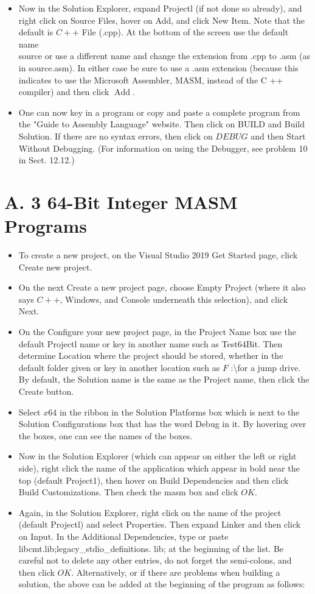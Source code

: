 \documentclass[10pt]{book}
\begin{document}
\begin{itemize}
  \item Now in the Solution Explorer, expand Projectl (if not done so already), and right click on Source Files, hover on Add, and click New Item. Note that the default is $C++$ File (.cpp). At the bottom of the screen use the default name\\
source or use a different name and change the extension from .cpp to .asm (as in source.asm). In either case be sure to use a .asm extension (because this indicates to use the Microsoft Assembler, MASM, instead of the C ++ compiler) and then click $\operatorname{Add}$.
  \item One can now key in a program or copy and paste a complete program from the "Guide to Assembly Language" website. Then click on BUILD and Build Solution. If there are no syntax errors, then click on $D E B U G$ and then Start Without Debugging. (For information on using the Debugger, see problem 10 in Sect. 12.12.)
\end{itemize}

\section*{A. 3 64-Bit Integer MASM Programs}
\begin{itemize}
  \item To create a new project, on the Visual Studio 2019 Get Started page, click Create new project.
  \item On the next Create a new project page, choose Empty Project (where it also says $C++$, Windows, and Console underneath this selection), and click Next.
  \item On the Configure your new project page, in the Project Name box use the default Projectl name or key in another name such as Test64Bit. Then determine Location where the project should be stored, whether in the default folder given or key in another location such as $F$ :\textbackslash for a jump drive. By default, the Solution name is the same as the Project name, then click the Create button.
  \item Select $x 64$ in the ribbon in the Solution Platforms box which is next to the Solution Configurations box that has the word Debug in it. By hovering over the boxes, one can see the names of the boxes.
  \item Now in the Solution Explorer (which can appear on either the left or right side), right click the name of the application which appear in bold near the top (default Project1), then hover on Build Dependencies and then click Build Customizations. Then check the masm box and click $O K$.
  \item Again, in the Solution Explorer, right click on the name of the project (default Projectl) and select Properties. Then expand Linker and then click on Input. In the Additional Dependencies, type or paste libcmt.lib;legacy\_stdio\_definitions. lib; at the beginning of the list. Be careful not to delete any other entries, do not forget the semi-colons, and then click $O K$. Alternatively, or if there are problems when building a solution, the above can be added at the beginning of the program as follows:
\end{itemize}
\end{document}
